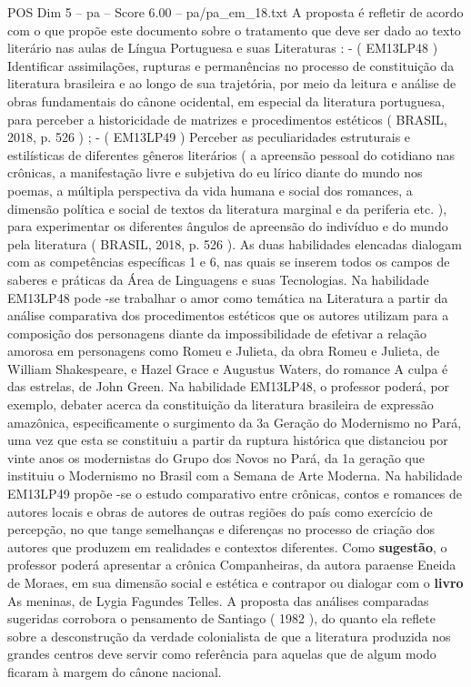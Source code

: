 \begin{textsample}{POS Dim 5 – pa – Score 6.00 – pa/pa\_em\_18.txt}
A proposta é refletir de acordo com o que propõe este documento sobre o tratamento que deve ser dado ao texto literário nas aulas de Língua Portuguesa e suas Literaturas : - ( EM13LP48 ) Identificar assimilações, rupturas e permanências no processo de constituição da literatura brasileira e ao longo de sua trajetória, por meio da leitura e análise de obras fundamentais do cânone ocidental, em especial da literatura portuguesa, para perceber a historicidade de matrizes e procedimentos estéticos ( BRASIL, 2018, p. 526 ) ; - ( EM13LP49 ) Perceber as peculiaridades estruturais e estilísticas de diferentes gêneros literários ( a apreensão pessoal do cotidiano nas crônicas, a manifestação livre e subjetiva do eu lírico diante do mundo nos poemas, a múltipla perspectiva da vida humana e social dos romances, a dimensão política e social de textos da literatura marginal e da periferia etc. ), para experimentar os diferentes ângulos de apreensão do indivíduo e do mundo pela literatura ( BRASIL, 2018, p. 526 ).
As duas habilidades elencadas dialogam com as competências específicas 1 e 6, nas quais se inserem todos os campos de saberes e práticas da Área de Linguagens e suas Tecnologias.
Na habilidade EM13LP48 pode -se trabalhar o amor como temática na Literatura a partir da análise comparativa dos procedimentos estéticos que os autores utilizam para a composição dos personagens diante da impossibilidade de efetivar a relação amorosa em personagens como Romeu e Julieta, da obra Romeu e Julieta, de William Shakespeare, e Hazel Grace e Augustus Waters, do romance A culpa é das estrelas, de John Green.
Na habilidade EM13LP48, o professor poderá, por exemplo, debater acerca da constituição da literatura brasileira de expressão amazônica, especificamente o surgimento da 3a Geração do Modernismo no Pará, uma vez que esta se constituiu a partir da ruptura histórica que distanciou por vinte anos os modernistas do Grupo dos Novos no Pará, da 1a geração que instituiu o Modernismo no Brasil com a Semana de Arte Moderna.
Na habilidade EM13LP49 propõe -se o estudo comparativo entre crônicas, contos e romances de autores locais e obras de autores de outras regiões do país como exercício de percepção, no que tange semelhanças e diferenças no processo de criação dos autores que produzem em realidades e contextos diferentes.
Como \textbf{sugestão}, o professor poderá apresentar a crônica Companheiras, da autora paraense Eneida de Moraes, em sua dimensão social e estética e contrapor ou dialogar com o \textbf{livro} As meninas, de Lygia Fagundes Telles.
A proposta das análises comparadas sugeridas corrobora o pensamento de Santiago ( 1982 ), do quanto ela reflete sobre a desconstrução da verdade colonialista de que a literatura produzida nos grandes centros deve servir como referência para aquelas que de algum modo ficaram à margem do cânone nacional.

\end{textsample}
